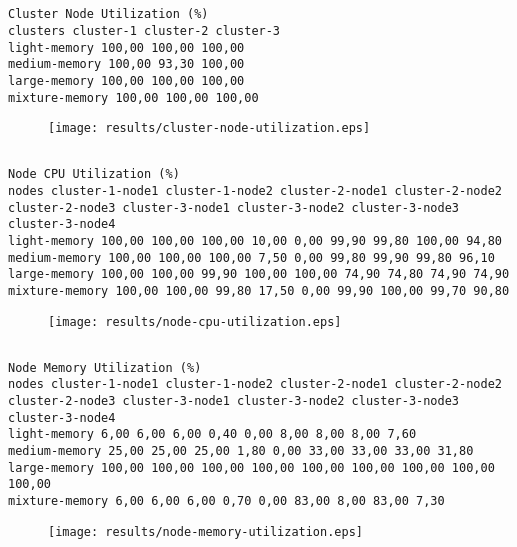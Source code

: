 \documentclass{elsart}
\begin{document}
\subsection{}

\begin{lstlisting}[caption={}]
Cluster Node Utilization (%)
clusters cluster-1 cluster-2 cluster-3
light-memory 100,00 100,00 100,00
medium-memory 100,00 93,30 100,00
large-memory 100,00 100,00 100,00
mixture-memory 100,00 100,00 100,00
\end{lstlisting}

\begin{figure}[ht]
\centering
\texttt{[image: results/cluster-node-utilization.eps]}
\caption{}\label{fig:cluster-node-utilization.eps}
\end{figure}

\subsection{}

\begin{lstlisting}[caption={}]
Node CPU Utilization (%)
nodes cluster-1-node1 cluster-1-node2 cluster-2-node1 cluster-2-node2 cluster-2-node3 cluster-3-node1 cluster-3-node2 cluster-3-node3 cluster-3-node4
light-memory 100,00 100,00 100,00 10,00 0,00 99,90 99,80 100,00 94,80
medium-memory 100,00 100,00 100,00 7,50 0,00 99,80 99,90 99,80 96,10
large-memory 100,00 100,00 99,90 100,00 100,00 74,90 74,80 74,90 74,90
mixture-memory 100,00 100,00 99,80 17,50 0,00 99,90 100,00 99,70 90,80
\end{lstlisting}

\begin{figure}[ht]
\centering
\texttt{[image: results/node-cpu-utilization.eps]}
\caption{}\label{fig:node-cpu-utilization.eps}
\end{figure}

\subsection{}

\begin{lstlisting}[caption={}]
Node Memory Utilization (%)
nodes cluster-1-node1 cluster-1-node2 cluster-2-node1 cluster-2-node2 cluster-2-node3 cluster-3-node1 cluster-3-node2 cluster-3-node3 cluster-3-node4
light-memory 6,00 6,00 6,00 0,40 0,00 8,00 8,00 8,00 7,60
medium-memory 25,00 25,00 25,00 1,80 0,00 33,00 33,00 33,00 31,80
large-memory 100,00 100,00 100,00 100,00 100,00 100,00 100,00 100,00 100,00
mixture-memory 6,00 6,00 6,00 0,70 0,00 83,00 8,00 83,00 7,30
\end{lstlisting}

\begin{figure}[ht]
\centering
\texttt{[image: results/node-memory-utilization.eps]}
\caption{}\label{fig:node-memory-utilization.eps}
\end{figure}
\end{document}
